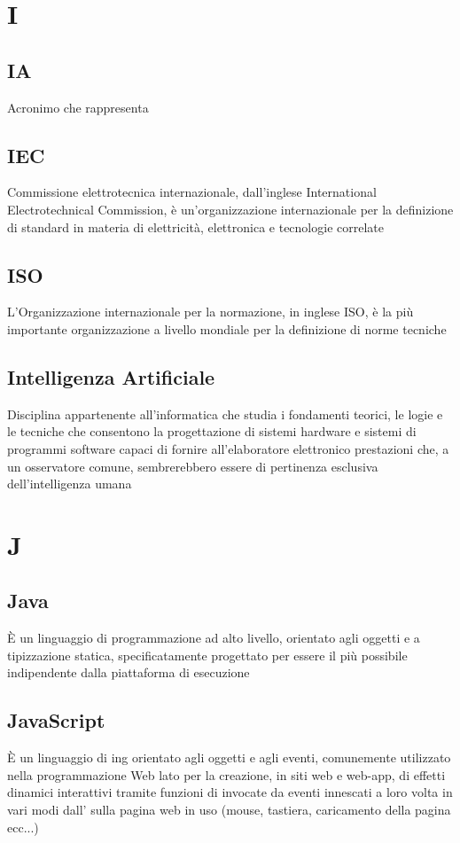 {{%
\section{I}

		\subsection{IA}
		Acronimo che rappresenta 

		\subsection{IEC}
		Commissione elettrotecnica internazionale, dall'inglese International Electrotechnical Commission, è un'organizzazione internazionale per la definizione di standard in materia di elettricità, elettronica e tecnologie correlate


		\subsection{ISO}
		L'Organizzazione internazionale per la normazione, in inglese ISO, è la più importante organizzazione a livello mondiale per la definizione di norme tecniche


		\subsection{Intelligenza Artificiale}
		Disciplina appartenente all'informatica che studia i fondamenti teorici, le logie e le tecniche che consentono la progettazione di sistemi hardware e sistemi di programmi software capaci di fornire all’elaboratore elettronico prestazioni che, a un osservatore comune, sembrerebbero essere di pertinenza esclusiva dell’intelligenza umana


\section{J}
		\subsection{Java}
		È un linguaggio di programmazione ad alto livello, orientato agli oggetti e a tipizzazione statica, specificatamente progettato per essere il più possibile indipendente dalla piattaforma di esecuzione


		\subsection{JavaScript}
		È un linguaggio di ing orientato agli oggetti e agli eventi, comunemente utilizzato nella programmazione Web lato  per la creazione, in siti web e web-app, di effetti dinamici interattivi tramite funzioni di  invocate da eventi innescati a loro volta in vari modi dall' sulla pagina web in uso (mouse, tastiera, caricamento della pagina ecc...)


}}
